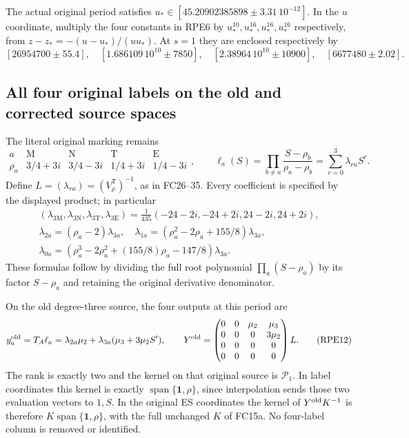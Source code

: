 The actual original period satisfies
$u_*\in[45.20902385898\mathbin\pm3.31\,10^{-12}]$.
In the $u$ coordinate, multiply the four constants in RPE6 by
$u_*^{10},u_*^{16},u_*^{16},u_*^{16}$ respectively, from
$z-z_*=-(u-u_*)/(uu_*)$.
At $s=1$ they are enclosed respectively by
\[
 [26954700\mathbin\pm55.4],\quad
 [1.686109\,10^{10}\mathbin\pm7850],\quad
 [2.38964\,10^{10}\mathbin\pm10900],\quad
 [6677480\mathbin\pm2.02].
 \tag{RPE9}
\]

\subsection{All four original labels on the old and corrected source spaces}
The literal original marking remains
\[
 \begin{array}{c|cccc}
 a&\mathrm M&\mathrm N&\mathrm T&\mathrm E\\\hline
 \rho_a&3/4+3i&3/4-3i&1/4+3i&1/4-3i
 \end{array},\qquad
 \ell_a(S)=\prod_{b\ne a}\frac{S-\rho_b}{\rho_a-\rho_b}
             =\sum_{r=0}^3\lambda_{ra}S^r.
 \tag{RPE10}
\]
Define $L=(\lambda_{ra})=(V_\rho^{\mathsf T})^{-1}$, as in FC26--35.
Every coefficient is specified by the displayed product; in particular
\[
 \begin{gathered}
 (\lambda_{3\mathrm M},\lambda_{3\mathrm N},
   \lambda_{3\mathrm T},\lambda_{3\mathrm E})
 =\frac1{435}(-24-2i,-24+2i,24-2i,24+2i),\\
 \lambda_{2a}=(\rho_a-2)\lambda_{3a},\quad
 \lambda_{1a}=(\rho_a^2-2\rho_a+155/8)\lambda_{3a},\\
 \lambda_{0a}=(\rho_a^3-2\rho_a^2+(155/8)\rho_a-147/8)\lambda_{3a}.
 \end{gathered}\tag{RPE11}
\]
These formulas follow by dividing the full root polynomial
$\prod_a(S-\rho_a)$ by its factor $S-\rho_a$ and retaining the
original derivative denominator.

On the old degree-three source, the four outputs at this period are
\[
 y_a^{\rm old}=T_A\ell_a
       =\lambda_{2a}\mu_2+\lambda_{3a}(\mu_3+3\mu_2S'),\qquad
 Y^{\rm old}=
 \begin{pmatrix}
 0&0&\mu_2&\mu_3\\0&0&0&3\mu_2\\0&0&0&0\\0&0&0&0
 \end{pmatrix}L.
 \tag{RPE12}
\]
The rank is exactly two and the kernel on that original source is
$\mathcal P_1$. In label coordinates this kernel is exactly
$\operatorname{span}\{\boldsymbol1,\rho\}$, since interpolation
sends those two evaluation vectors to $1,S$.
In the original ES coordinates the kernel of
$Y^{\rm old}K^{-1}$ is therefore
$K\operatorname{span}\{\boldsymbol1,\rho\}$, with the full
unchanged $K$ of FC15a. No four-label column is removed or identified.

